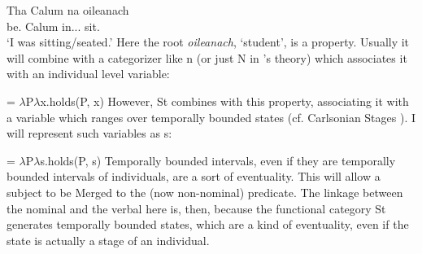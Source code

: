 \documentclass[output=paper]{langsci/langscibook}
\begin{document}
\ea
{}
\z

\ea {}
\sn \gll  Tha Calum na oileanach\\
be.\Prs{} Calum in.\Poss.\Tsg.\M{} sit.\Vn{}\\
\glt \enquote*{I was sitting/seated.}
\z
Here the root \emph{oileanach}, `student', is a property. Usually it will
combine with a categorizer like n (or just N in \citeauthor{adgerbook}
\citeyear{adgerbook}'s theory) which
associates it with an individual level variable:

\ea {} = $\lambda$P$\lambda$x.holds(P, x) \z
However, St combines with this property, associating it with a variable which
ranges over temporally bounded states (cf. Carlsonian Stages
\citep{carlson:77}). I will represent such variables as s:

\ea {} = $\lambda$P$\lambda$s.holds(P, s) \z
Temporally bounded intervals, even if they are temporally bounded intervals of
individuals,  are a sort of eventuality. This will allow a subject to be Merged to the (now non-nominal)
predicate. The linkage between the nominal and the verbal here is, then,
because the functional category St generates temporally bounded states, which
are a kind of eventuality, even if the state is actually a stage of an
individual.
\end{document}
